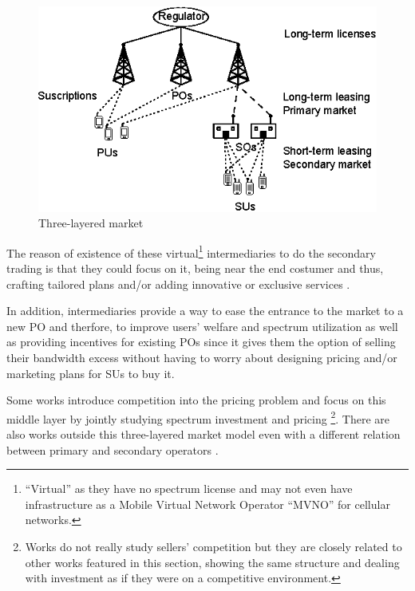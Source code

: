 \begin{figure}[!ht]
  \begin{center}
  \includegraphics[scale=1.25]{Fig5.eps}
  \end{center}
  \caption{Three-layered market}
   \label{fig:LayeredMarket}
\end{figure}

The reason of existence of these virtual\footnote{``Virtual'' as they have no spectrum license and may not even have infrastructure as a Mobile Virtual Network Operator ``MVNO'' for cellular networks.} intermediaries to do the secondary trading is that they could focus on it, being near the end costumer and thus, crafting tailored plans and/or adding innovative or exclusive services \cite{ref:Duan2010_Comp,ref:Levi2012}.

In addition, intermediaries provide a way to ease the entrance to the market to a new PO and therfore, to improve users' welfare and spectrum utilization as well as providing incentives for existing POs since it gives them the option of selling their bandwidth excess without having to worry about designing pricing and/or marketing plans for SUs to buy it. 

Some works introduce competition into the pricing problem and focus on this middle layer by jointly studying spectrum investment and pricing \cite{ref:Jia2008_com,ref:Duan2010_Cog,ref:Duan2010_Comp,ref:Duan2011_Duo,ref:Duan2011_Inves,ref:Kim2011}\footnote{Works \cite{ref:Duan2010_Cog,ref:Duan2011_Inves} do not really study sellers' competition but they are closely related to other works featured in this section, showing the same structure and dealing with investment as if they were on a competitive environment.}. There are also works outside this three-layered market model \cite{ref:Illeri2005,ref:Xing2007,ref:Maille2009,ref:Dixit2010} even with a different relation between primary and secondary operators \cite{ref:Guijarro2011}.

